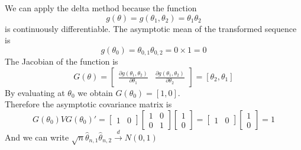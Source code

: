 \documentclass[DIV=14,titlepage=false]{scrreprt}
\begin{document}
\begin{solution}
    We can apply the delta method because the function \[g(\theta) = g(\theta_1, \theta_2)=\theta_1 \theta_2\] is continuously differentiable. The asymptotic mean of the transformed sequence is \[g(\theta_0)=\theta_{0,1} \theta_{0,2} = 0\times1=0\] The Jacobian of the function is \[G(\theta)=\begin{bmatrix}
        \frac{\partial g(\theta_1, \theta_2)}{\partial \theta_1} & \frac{\partial g(\theta_1, \theta_2)}{\partial \theta_2}
    \end{bmatrix} 
    = [\theta_2, \theta_1] \] By evaluating at $\theta_0$ we obtain $G(\theta_0) = [1,0]$.\\
    Therefore the asymptotic covariance matrix is
    \[
        G(\theta_0)VG(\theta_0)'= 
            \begin{bmatrix}
                1 & 0
            \end{bmatrix}
            \begin{bmatrix}
                1 & 0 \\
                0 & 1
            \end{bmatrix}
            \begin{bmatrix}
                1 \\
                0
            \end{bmatrix}=
            \begin{bmatrix}
                1 & 0
            \end{bmatrix}
            \begin{bmatrix}
                1\\
                0 
            \end{bmatrix}=1
    \]
    And we can write $\sqrt{n}\hat\theta_{n,1}\hat\theta_{n,2} \overset{d}{\to} N(0,1)$
\end{solution}
\end{document}
